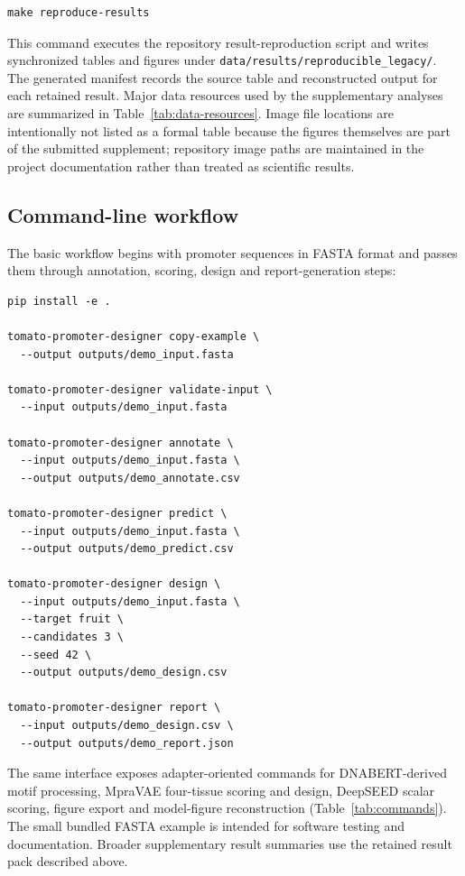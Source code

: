 \documentclass[10pt]{article}
\begin{document}
\begin{verbatim}
make reproduce-results
\end{verbatim}

This command executes the repository result-reproduction script and writes synchronized tables and figures under \texttt{data/results/reproducible\_legacy/}. The generated manifest records the source table and reconstructed output for each retained result. Major data resources used by the supplementary analyses are summarized in Table~\ref{tab:data-resources}. Image file locations are intentionally not listed as a formal table because the figures themselves are part of the submitted supplement; repository image paths are maintained in the project documentation rather than treated as scientific results.

\subsection{Command-line workflow}

The basic workflow begins with promoter sequences in FASTA format and passes them through annotation, scoring, design and report-generation steps:

\begin{verbatim}
pip install -e .

tomato-promoter-designer copy-example \
  --output outputs/demo_input.fasta

tomato-promoter-designer validate-input \
  --input outputs/demo_input.fasta

tomato-promoter-designer annotate \
  --input outputs/demo_input.fasta \
  --output outputs/demo_annotate.csv

tomato-promoter-designer predict \
  --input outputs/demo_input.fasta \
  --output outputs/demo_predict.csv

tomato-promoter-designer design \
  --input outputs/demo_input.fasta \
  --target fruit \
  --candidates 3 \
  --seed 42 \
  --output outputs/demo_design.csv

tomato-promoter-designer report \
  --input outputs/demo_design.csv \
  --output outputs/demo_report.json
\end{verbatim}

The same interface exposes adapter-oriented commands for DNABERT-derived motif processing, MpraVAE four-tissue scoring and design, DeepSEED scalar scoring, figure export and model-figure reconstruction (Table~\ref{tab:commands}). The small bundled FASTA example is intended for software testing and documentation. Broader supplementary result summaries use the retained result pack described above.
\end{document}
